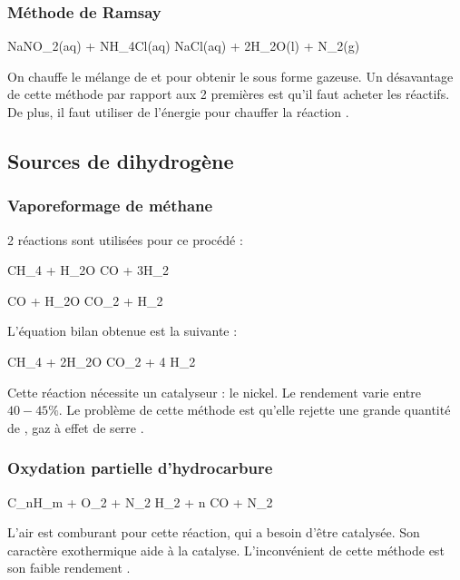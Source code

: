 	\subsubsection{Méthode de Ramsay}
	
	\begin{chemmath}
			NaNO_2(aq) + NH_4Cl(aq) \longrightarrow NaCl(aq) + 2H_2O(l) + N_2(g)
	\end{chemmath}
	
	On chauffe le mélange de  et  pour obtenir le  sous forme gazeuse.
	Un désavantage de cette méthode par rapport aux 2 premières est qu'il faut acheter les réactifs. De plus, il faut utiliser de l'énergie pour chauffer la réaction \cite{wiki-n2}.

	\subsection{Sources de dihydrogène}
		\subsubsection{Vaporeformage de méthane}
		2 réactions sont utilisées pour ce procédé \cite{afhypac} :
		
		\begin{chemmath} 
			CH_4 + H_2O \longleftrightarrow CO + 3H_2
		\end{chemmath}
		
		\begin{chemmath}
			CO + H_2O \longleftrightarrow CO_2 + H_2
		\end{chemmath}
		
		L'équation bilan obtenue est la suivante :
		
		\begin{chemmath}
			CH_4 + 2H_2O \longleftrightarrow CO_2 + 4 H_2
		\end{chemmath}
		
			Cette réaction nécessite un catalyseur : le nickel. Le rendement varie entre $40-45\%$. Le problème de cette 
			méthode est qu'elle rejette une grande quantité de , gaz à effet de serre \cite{wiki-h2}.
			
		\subsubsection{Oxydation partielle d'hydrocarbure}
		\begin{chemmath}
			C_nH_m +  O_2 +  N_2 \longrightarrow {} H_2 + n CO + \frac{3,76n}{2} N_2
		\end{chemmath}
		L'air est comburant pour cette réaction, qui a besoin d'être catalysée. Son caractère exothermique aide à la catalyse. 
		L'inconvénient de cette méthode est son faible rendement \cite{wiki-h2}.

